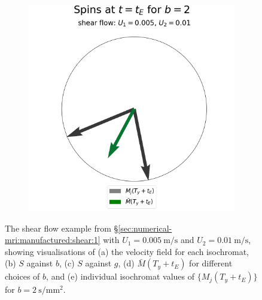 \begin{figure}
\begin{subfigure}{0.4\textwidth}
                        \caption{}
                        \label{fig:mri-shear-1:b}
                    \end{subfigure}
                    \begin{subfigure}{0.4\textwidth}
                        \centering
                        \includegraphics[width=\textwidth]{diagrams/results-mri/simple-tests/mri-spins_avg_2D_shear_test_1.png}
                        \caption{}
                        \label{fig:mri-shear-1:spins}
                    \end{subfigure}
                    \caption{The shear flow example from \S\ref{sec:numerical-mri:manufactured:shear:1} with $U_1 = \qty{0.005}{\metre\per\second}$ and $U_2 = \qty{0.01}{\metre\per\second}$, showing visualisations of (a) the velocity field for each isochromat, (b) $S$ against $b$, (c) $S$ against $g$, (d) $\bar{M}(T_y + t_E)$ for different choices of $b$, and (e) individual isochromat values of $\{ M_j(T_y + t_E) \}$ for $b=\qty{2}{\second\per\milli\metre^2}$.}
                    \label{fig:mri-shear-1}
                \end{figure}

